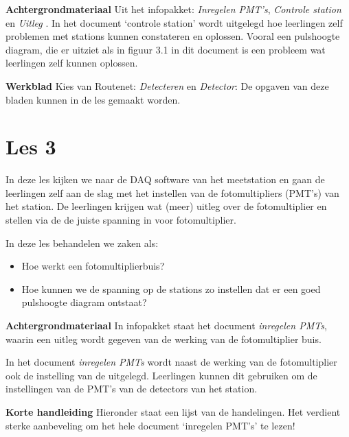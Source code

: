 \textbf{Achtergrondmateriaal}
Uit het infopakket: \textit{Inregelen
PMT's}, \textit{Controle station} en \textit{Uitleg \hisparc}. 
In het document `controle station' wordt uitgelegd hoe leerlingen zelf
problemen met stations kunnen constateren en oplossen. Vooral een
pulshoogte diagram, die er uitziet als in figuur 3.1 in dit document is
een probleem wat leerlingen zelf kunnen oplossen.

\textbf{Werkblad}
Kies van Routenet:
\textit{Detecteren} en \textit{Detector}:
De opgaven van deze bladen kunnen in de les gemaakt worden.

\section{Les 3}
In deze les kijken we naar de DAQ software van het meetstation en gaan de leerlingen
zelf aan de slag met het instellen van de fotomultipliers (PMT's) van het station.
De leerlingen krijgen wat (meer) uitleg over de fotomultiplier en stellen via de \hisparc \daq
de juiste spanning in voor fotomultiplier.

In deze les behandelen we zaken als:
\begin{itemize}
    \item Hoe werkt een fotomultiplierbuis? 
    \item Hoe kunnen we de spanning op de stations zo instellen dat er een
    goed pulshoogte diagram ontstaat?
\end{itemize}

\textbf{Achtergrondmateriaal}
In infopakket staat het document \textit{inregelen PMTs},
waarin een uitleg wordt gegeven van de werking van de fotomultiplier buis.

In het document \textit{inregelen PMTs} wordt naast de werking van de fotomultiplier
ook de instelling van de \hisparc \daq uitgelegd. Leerlingen kunnen dit gebruiken om
de instellingen van de PMT's van de detectors van het \hisparc station.

\textbf{Korte handleiding} Hieronder staat een lijst van de handelingen. 
Het verdient sterke aanbeveling om het hele document `inregelen PMT's' te lezen!

